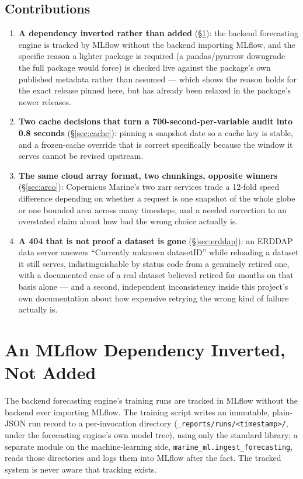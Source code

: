 \subsection{Contributions}

\begin{enumerate}\itemsep2pt
\item \textbf{A dependency inverted rather than added} (\S\ref{sec:mlflow}):
the backend forecasting engine is tracked by MLflow without the backend
importing MLflow, and the specific reason a lighter package is required
(a pandas/pyarrow downgrade the full package would force) is checked live
against the package's own published metadata rather than assumed --- which
shows the reason holds for the exact release pinned here, but has already
been relaxed in the package's newer releases.
\item \textbf{Two cache decisions that turn a 700-second-per-variable audit
into 0.8 seconds} (\S\ref{sec:cache}): pinning a snapshot date so a cache key
is stable, and a frozen-cache override that is correct specifically because
the window it serves cannot be revised upstream.
\item \textbf{The same cloud array format, two chunkings, opposite winners}
(\S\ref{sec:arco}): Copernicus Marine's two zarr services trade a 12-fold
speed difference depending on whether a request is one snapshot of the whole
globe or one bounded area across many timesteps, and a needed correction to
an overstated claim about how bad the wrong choice actually is.
\item \textbf{A 404 that is not proof a dataset is gone} (\S\ref{sec:erddap}):
an ERDDAP data server answers ``Currently unknown datasetID'' while
reloading a dataset it still serves, indistinguishable by status code from
a genuinely retired one, with a documented case of a real dataset believed
retired for months on that basis alone --- and a second, independent
inconsistency inside this project's own documentation about how expensive
retrying the wrong kind of failure actually is.
\end{enumerate}

\section{An MLflow Dependency Inverted, Not Added}
\label{sec:mlflow}

 The backend forecasting engine's training runs are tracked in
MLflow \citep{mlflow2020} without the backend ever importing MLflow. The
training script writes an immutable, plain-JSON run record to a
per-invocation directory (\texttt{\_reports/runs/<timestamp>/}, under the
forecasting engine's own model tree), using only the standard library; a
separate module on the machine-learning side,
\texttt{marine\_ml.ingest\_forecasting}, reads those directories and logs
them into MLflow after the fact. The tracked system is never aware that
tracking exists.

